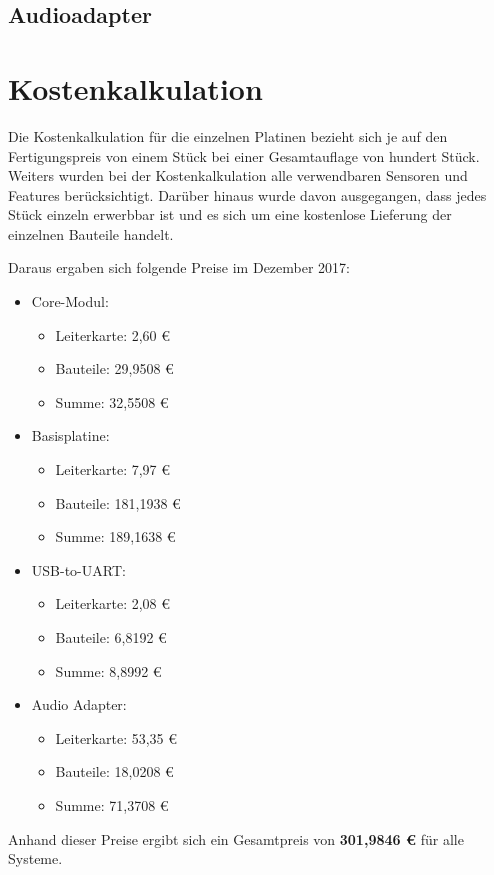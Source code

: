 \subsection{Audioadapter}
\label{sec:stücklisten-audio}

\section{Kostenkalkulation}
Die Kostenkalkulation für die einzelnen Platinen bezieht sich je auf den Fertigungspreis von einem Stück bei einer Gesamtauflage von hundert Stück. Weiters wurden bei der Kostenkalkulation alle verwendbaren Sensoren und Features berücksichtigt. Darüber hinaus wurde davon ausgegangen, dass jedes Stück einzeln erwerbbar ist und es sich um eine kostenlose Lieferung der einzelnen Bauteile handelt.

Daraus ergaben sich folgende Preise im Dezember 2017:
\begin{itemize}
    \item \gls{Core-Modul}:
    \begin{itemize}
        \item Leiterkarte: 2,60 €
        \item Bauteile: 29,9508 €
        \item Summe: 32,5508 €
    \end{itemize}
    \item \gls{Basisplatine}:
    \begin{itemize}
        \item Leiterkarte: 7,97 €
        \item Bauteile: 181,1938 €
        \item Summe: 189,1638 €
    \end{itemize}
    \item \gls{USB-to-UART}:
    \begin{itemize}
        \item Leiterkarte: 2,08 €
        \item Bauteile: 6,8192 €
        \item Summe: 8,8992 €
    \end{itemize}
    \item Audio Adapter:
    \begin{itemize}
        \item Leiterkarte: 53,35 €
        \item Bauteile: 18,0208 €
        \item Summe: 71,3708 €
    \end{itemize}
\end{itemize}

Anhand dieser Preise ergibt sich ein Gesamtpreis von \textbf{301,9846 €} für alle Systeme.
